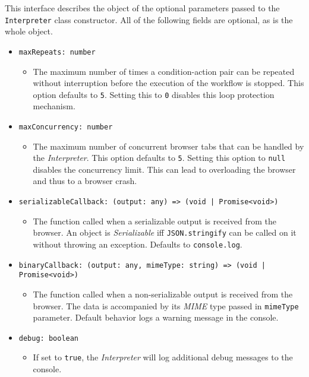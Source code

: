 This interface describes the object of the optional parameters passed to the \texttt{Interpreter} class constructor.
All of the following fields are optional, as is the whole object.
\begin{itemize}
   \item \texttt{maxRepeats: number} 
   \begin{itemize}
      \item The maximum number of times a condition-action pair can be repeated without interruption before the execution of the workflow is stopped.
      This option defaults to \texttt{5}. Setting this to \texttt{0} disables this loop protection mechanism.
   \end{itemize}
   \item \texttt{maxConcurrency: number}
   \begin{itemize}
      \item The maximum number of concurrent browser tabs that can be handled by the \textit{Interpreter}.
      This option defaults to \texttt{5}. Setting this option to \texttt{null} disables the concurrency limit. 
      This can lead to overloading the browser and thus to a browser crash.
   \end{itemize}
   \item \texttt{serializableCallback: (output: any) => (void | Promise<void>)}
   \begin{itemize}
      \item The function called when a serializable output is received from the browser.
      An object is \textit{Serializable} iff \texttt{JSON.stringify} can be called on it without throwing an exception.
      Defaults to \texttt{console.log}.
   \end{itemize}
   \item \texttt{binaryCallback: (output: any, mimeType: string) => (void | Promise<void>)}
   \begin{itemize}
      \item The function called when a non-serializable output is received from the browser.
      The data is accompanied by its \textit{MIME} type passed in \texttt{mimeType} parameter.
      Default behavior logs a warning message in the console.
   \end{itemize}
   \item \texttt{debug: boolean}
   \begin{itemize}
      \item If set to \texttt{true}, the \textit{Interpreter} will log additional debug messages to the console.

\end{itemize}
\end{itemize}
